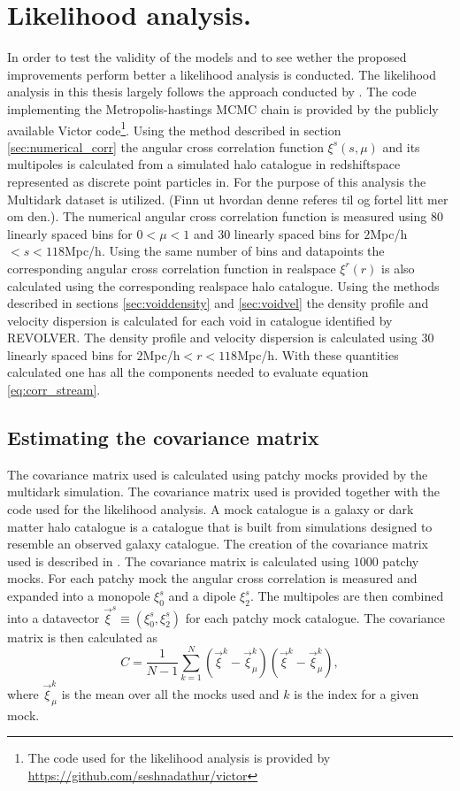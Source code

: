\section{Likelihood analysis.}\label{sec:maximum_likelihood_method}
In order to test the validity of the models and to see wether the proposed improvements perform better a likelihood analysis is conducted. The likelihood analysis in this thesis largely follows the approach conducted by \cite{BeyondBAO}. The code implementing the Metropolis-hastings MCMC chain is provided by the publicly available Victor code\footnote{The code used for the likelihood analysis is provided by \url{https://github.com/seshnadathur/victor}}. Using the method described in section \ref{sec:numerical_corr} the angular cross correlation function $\xi^s(s,\mu)$ and its multipoles is calculated from a simulated halo catalogue in redshiftspace represented as discrete point particles in. For the purpose of this analysis the Multidark dataset is utilized. (Finn ut hvordan denne referes til og fortel litt mer om den.). The numerical angular cross correlation function  is measured using $80$ linearly spaced bins for $0<\mu<1$ and $30$ linearly spaced bins for $2$Mpc/h$<s<118$Mpc/h. Using the same number of bins and datapoints the corresponding angular cross correlation function in realspace $\xi^r(r)$ is also calculated using the corresponding realspace halo catalogue. Using the methods described in sections \ref{sec:voiddensity} and \ref{sec:voidvel} the density profile and velocity dispersion is calculated for each void in catalogue identified by REVOLVER. The density profile and velocity dispersion is calculated using $30$ linearly spaced bins for $2$Mpc/h$<r<118$Mpc/h. With these quantities calculated one has all the components needed to evaluate equation \ref{eq:corr_stream}.
\subsection{Estimating the covariance matrix}
The covariance matrix used is calculated using patchy mocks provided by the multidark simulation\cite{MDmock1}\cite{MDmock2}. The covariance matrix used is provided together with the code used for the likelihood analysis. A mock catalogue is a galaxy or dark matter halo catalogue is a catalogue that is built from simulations designed to resemble an observed galaxy catalogue. The creation of the covariance matrix used is described in \cite{BeyondBAO}. The covariance matrix is calculated using $1000$ patchy mocks. For each patchy mock the angular cross correlation is measured and expanded into a monopole $\xi_0^s$ and a dipole $\xi_2^s$. The multipoles are then combined into a datavector $\vec{\xi}^s\equiv(\xi_0^s, \xi_2^s)$ for each patchy mock catalogue. The covariance matrix is then calculated as
\begin{equation}
    C=\frac{1}{N-1}\sum_{k=1}^N(\vec{\xi} ^k-\vec{\xi}^k_\mu)(\vec{\xi}^k-\vec{\xi}^k_\mu),
\end{equation} 
where $\vec{\xi}^k_\mu$ is the mean over all the mocks used and $k$ is the index for a given mock.
